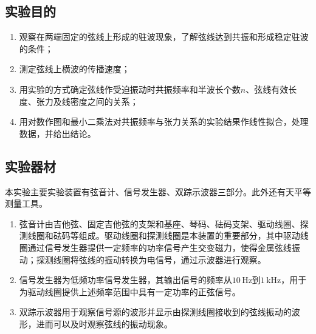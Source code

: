 \documentclass[UTF8]{article}
\theoremstyle{MyLineTheoremStyle} %
\theoremstyle{MyBlockTheoremStyle} %
\theoremstyle{MySubsubsectionStyle} %
\begin{document}
\subsection{实验目的}
\begin{enumerate}
\item 观察在两端固定的弦线上形成的驻波现象，了解弦线达到共振和形成稳定驻波的条件；
\item 测定弦线上横波的传播速度；
\item 用实验的方式确定弦线作受迫振动时共振频率和半波长个数$ n $、弦线有效长度、张力及线密度之间的关系；
\item 用对数作图和最小二乘法对共振频率与张力关系的实验结果作线性拟合，处理数据，并给出结论。
\end{enumerate}



\subsection{实验器材}
本实验主要实验装置有弦音计、信号发生器、双踪示波器三部分。此外还有天平等测量工具。
\begin{enumerate}
\item 弦音计由吉他弦、固定吉他弦的支架和基座、琴码、砝码支架、驱动线圈、探测线圈和砝码等组成。驱动线圈和探测线圈是本装置的重要部分，其中驱动线圈通过信号发生器提供一定频率的功率信号产生交变磁力，使得金属弦线振动；探测线圈将弦线的振动转换为电信号，通过示波器进行观察。
\item 信号发生器为低频功率信号发生器，其输出信号的频率从$ 10\,\mathrm{Hz} $到$ 1\,\mathrm{kHz} $，用于为驱动线圈提供上述频率范围中具有一定功率的正弦信号。
\item 双踪示波器用于观察信号源的波形并显示由探测线圈接收到的弦线振动的波形，进而可以及时观察弦线的振动现象。
\end{enumerate}
\end{document}
